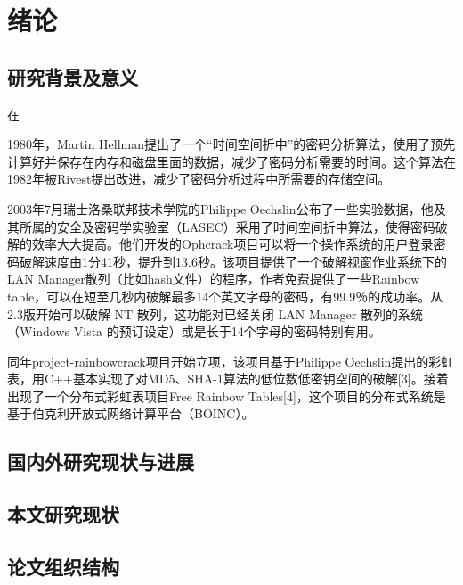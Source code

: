 \chapter{绪论}
\section{研究背景及意义}
{在}
{1980年，Martin Hellman\cite{hellman}提出了一个“时间空间折中”的密码分析算法，使用了预先计算好并保存在内存和磁盘里面的数据，减少了密码分析需要的时间。这个算法在1982年被Rivest提出改进，减少了密码分析过程中所需要的存储空间。

2003年7月瑞士洛桑联邦技术学院的Philippe Oechslin公布了一些实验数据，他及其所属的安全及密码学实验室（LASEC）采用了时间空间折中算法，使得密码破解的效率大大提高。他们开发的Ophcrack项目可以将一个操作系统的用户登录密码破解速度由1分41秒，提升到13.6秒\cite{PO}。该项目提供了一个破解视窗作业系统下的LAN Manager散列（比如hash文件）的程序，作者免费提供了一些Rainbow table，可以在短至几秒内破解最多14个英文字母的密码，有99.9％的成功率。从2.3版开始可以破解 NT 散列，这功能对已经关闭 LAN Manager 散列的系统（Windows Vista 的预订设定）或是长于14个字母的密码特别有用。

同年project-rainbowcrack项目开始立项，该项目基于Philippe Oechslin提出的彩虹表，用C++基本实现了对MD5、SHA-1算法的低位数低密钥空间的破解[3]。接着出现了一个分布式彩虹表项目Free Rainbow Tables[4]，这个项目的分布式系统是基于伯克利开放式网络计算平台（BOINC）。


}
\section{国内外研究现状与进展}
\section{本文研究现状}
\section{论文组织结构}
